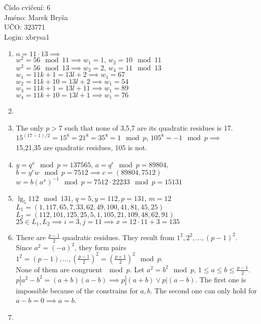 \documentclass[a4paper,12pt]{extarticle}
\begin{document}
\begin{flushleft}
Číslo cvičení: 6 \\ 
Jméno: Marek Bryša \\
UČO: 323771\\
Login: xbrysa1\\
\end{flushleft}
\begin{enumerate}
  \item
    $n=11\cdot13 \implies$\\
    $w^2=56 \mod 11\implies w_1=1,\, w_2=10 \mod 11$\\
    $w^2=56 \mod 13\implies w_3=2,\, w_4=11 \mod 13$\\
    $w_1=11k+1=13l+2 \implies w_1=67$\\
    $w_2=11k+10=13l+2 \implies w_1=54$\\
    $w_3=11k+1=13l+11 \implies w_1=89$\\
    $w_4=11k+10=13l+1 \implies w_1=76$\\
  \item
  \item
    The only $p> 7$ such that none of 3,5,7 are its quadratic residues is 17.\\
    $15^{(17-1)/2}=15^8 = 21^8 = 35^8 = 1 \mod p$, $105^8=-1 \mod p\implies$\\
    15,21,35 are quadratic residues, 105 is not.
  \item
    $y=q^x \mod p=137565$, $a=q^r \mod p=89804$, $b=y^r w \mod p = 7512\implies c=(89804,7512)$\\
    $w=b(a^x)^{-1} \mod p=7512\cdot 22233\mod p = 15131 $
  \item
    $\lg_5 112 \mod 131$, $q=5,y=112,p=131$, $m=12$\\
    $L_1=(1, 117, 65, 7, 33, 62, 49, 100, 41, 81, 45, 25)$\\
    $L_2=(112, 101, 125, 25, 5, 1, 105, 21, 109, 48, 62, 91)$\\
    $25\in L_1,L_2 \implies i=3, j=11\implies x = 12\cdot11+3= 135$
  \item
    There are $\frac{p-1}{2}$ quadratic residues. They result from $1^2,2^2,\dots,(p-1)^2$.\\
    Since $a^2=(-a)^2$, they form pairs $1^2=(p-1),\dots,(\frac{p-1}{2})^2=(\frac{p+1}{2})^2 \mod p$.\\
    None of them are congruent $\mod p$. Let $a^2=b^2 \mod p$, $1\leq a\leq b\leq\frac{p-1}{2}$.\\
    $p|a^2-b^2=(a+b)(a-b) \implies p|(a+b) \vee p|(a-b)$. The first one is impossible because of the constrains for $a,b$.
    The second one can only hold for $a-b=0 \implies a=b$.
  \item
    
    
    
\end{enumerate}
\end{document}
